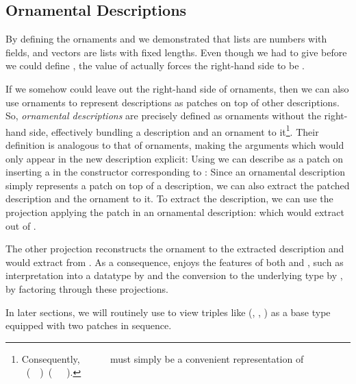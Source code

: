 \subsection{Ornamental Descriptions}\label{sec:background-ornamental-descriptions}
By defining the ornaments  and  we demonstrated that lists are numbers with fields, and vectors are lists with fixed lengths. Even though we had to give  before we could define , the value of  actually forces the right-hand side to be .

If we somehow could leave out the right-hand side of ornaments, then we can also use ornaments to represent descriptions as patches on top of other descriptions. So, \emph{ornamental descriptions} are precisely defined as ornaments without the right-hand side, effectively bundling a description and an ornament to it\footnote{Consequently, \ \ \ \ \  must simply be a convenient representation of \ (\ \ )\ (\ \ \ ).}. Their definition is analogous to that of ornaments, making the arguments which would only appear in the new description explicit:
Using  we can describe  as a patch on  inserting a  in the constructor corresponding to :
Since an ornamental description simply represents a patch on top of a description, we can also extract the patched description and the ornament to it. To extract the description, we can use the projection applying the patch in an ornamental description:
which would extract  out of .

The other projection reconstructs the ornament to the extracted description
and would extract  from . As a consequence,  enjoys the features of both  and , such as interpretation into a datatype by  and the conversion to the underlying type by , by factoring through these projections.

In later sections, we will routinely use  to view triples like (, , ) as a base type equipped with two patches in sequence.
